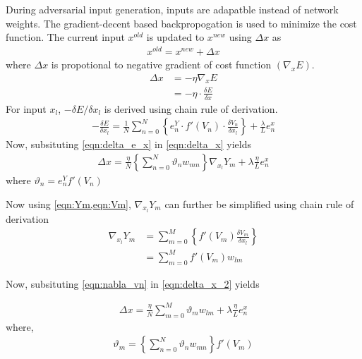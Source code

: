 \begin{appendices}
        During adversarial input generation, inputs are adapatble instead of network weights. The gradient-decent based backpropogation is used to minimize the cost function. The current input $x^{old}$ is updated to $x^{new}$ using $\Delta x$ as 
        \begin{align} \label{eqn:update_rule}
            x^{old} = x^{new} + \Delta x
        \end{align}
        where $\Delta x$ is propotional to negative gradient of cost function $(\nabla_{x}E)$.
        \begin{align} \label{eqn:delta_x}
            \Delta x &= - \eta \nabla_{x} E \nonumber \\ 
                     &= - \eta \cdot \frac{\delta E}{\delta x}
        \end{align}
        For input $x_{l}$, $- \delta E / \delta x_{l}$ is derived using chain rule of derivation.
        \begin{align} \label{eqn:delta_e_x}
            - \frac{\delta E }{\delta x_{l}} = \frac{1}{N} \sum \limits_{n=0}^{N} \left\{ e_n^Y \cdot f'(V_n) \cdot \frac{\delta V_n}{\delta x_l} \right\} + \frac{\lambda}{L} e_n^x
        \end{align}
        Now, subsituting \cref{eqn:delta_e_x} in \cref{eqn:delta_x} yields 
        \begin{align} \label{eqn:delta_x_2}
            \Delta x  = \frac{\eta}{N} \left\{ \sum \limits_{n=0}^{N} \vartheta_{n} w_{mn} \right\} \nabla_{x_l} Y_m + \lambda \frac{\eta}{L} e_n^x
        \end{align}
        where $\vartheta_{n} = e_n^Y f'(V_n) $

        Now using \cref{eqn:Ym,eqn:Vm}, $\nabla_{x_l} Y_m$ can further be simplified using chain rule of derivation
        \begin{align} \label{eqn:nabla_vn}
            \nabla_{x_l} Y_m &= \sum \limits_{m=0}^{M} \left\{ f'(V_m) \frac{\delta V_m}{\delta x_l} \right\} \nonumber \\
            &= \sum \limits_{m=0}^{M} f'(V_m) w_{lm}
        \end{align}
        
        Now, subsituting \cref{eqn:nabla_vn} in \cref{eqn:delta_x_2} yields

        \begin{align} \label{eqn:final_learning_eqn}
            \Delta x= \frac{\eta}{N} \sum \limits_{m=0}^{M} \vartheta_{m} w_{lm} + \lambda \frac{\eta}{L} e_n^x
        \end{align}
        where,
        \begin{align}
            \vartheta_{m} = \left\{ \sum \limits_{n=0}^{N} \vartheta_{n} w_{mn} \right\} f'(V_m) \nonumber
        \end{align}      

\end{appendices}